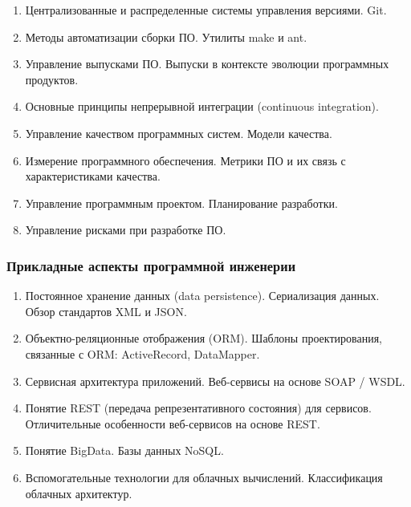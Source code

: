 \documentclass[a4paper,10pt]{article}
\newcounter{globalenum}
\newenvironment{genumerate}{%
	\begin{enumerate}%
	\afterlabel.%
	\setcounter{enumi}{\theglobalenum}%
}{%
	\setcounter{globalenum}{\theenumi}%
	\end{enumerate}%
}
\begin{document}
\begin{genumerate}
	\item
	Централизованные и распределенные системы управления версиями. Git.

	\item
	Методы автоматизации сборки ПО. Утилиты make и ant.

	\item
	Управление выпусками ПО. Выпуски в контексте эволюции программных продуктов.

	\item
	Основные принципы непрерывной интеграции (continuous integration).

	\item
	Управление качеством программных систем. Модели качества.

	\item
	Измерение программного обеспечения. Метрики ПО и их связь с характеристиками качества.

	\item
	Управление программным проектом. Планирование разработки.

	\item
	Управление рисками при разработке ПО.
\end{genumerate}

\subsubsection*{Прикладные аспекты программной инженерии}

\begin{genumerate}
	\item
	Постоянное хранение данных (data persistence). Сериализация данных. 
	Обзор стандартов XML и JSON.

	\item
	Объектно-реляционные отображения (ORM). Шаблоны проектирования, связанные с ORM: 
	ActiveRecord, DataMapper.

	\item
	Сервисная архитектура приложений. Веб-сервисы на основе SOAP / WSDL.

	\item
	Понятие REST (передача репрезентативного состояния) для сервисов. 
	Отличительные особенности веб-сервисов на основе REST.

	\item
	Понятие BigData. Базы данных NoSQL.

	\item
	Вспомогательные технологии для облачных вычислений. Классификация облачных архитектур.
\end{genumerate}
\end{document}
